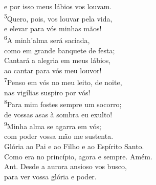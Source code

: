 \documentclass[opennany]{book}
\begin{document}
\begin{center}
    e por isso meus lábios vos louvam.
    \vspace{.2cm} \\
    \textsuperscript{\underline{\hspace{.06in}}\textcolor{VioletRed2}{5}}Quero, pois, vos louvar pela vida, \textsuperscript{\gresixstar{}} \\
    e elevar para vós minhas mãos! \\
    \textsuperscript{\underline{\hspace{.06in}}\textcolor{VioletRed2}{6}}A minh'alma será saciada, \textsuperscript{\gresixstar{}} \\
    como em grande banquete de festa; \\
    \textsuperscript{\underline{\hspace{.06in}}} Cantará a alegria em meus lábios, \textsuperscript{\gresixstar{}} \\
    ao cantar para vós meu louvor!
    \vspace{.2cm} \\
    \textsuperscript{\underline{\hspace{.06in}}\textcolor{VioletRed2}{7}}Penso em vós no meu leito, de noite, \\
    nas vigílias suspiro por vós! \\
    \textsuperscript{\underline{\hspace{.06in}}\textcolor{VioletRed2}{8}}Para mim fostes sempre um socorro; \textsuperscript{\gresixstar{}} \\
    de vossas asas à sombra eu exulto! \\
    \textsuperscript{\underline{\hspace{.06in}}\textcolor{VioletRed2}{9}}Minha alma se agarra em vós; \textsuperscript{\gresixstar{}} \\
    com poder vossa mão me sustenta.
    \vspace{.2cm} \\
    \textsuperscript{\underline{\hspace{.06in}}} Glória ao Pai e ao Filho e ao Espírito Santo.\ \textsuperscript{\gresixstar{}} \\
    Como era no princípio, agora e sempre. Amém.
    \vspace{.2cm} \\
    \textcolor{VioletRed2}{Ant.} Desde a aurora ansioso vos busco, \\
    para ver vossa glória e poder.
    \vspace{.2cm} \\

\end{center}
\end{document}

